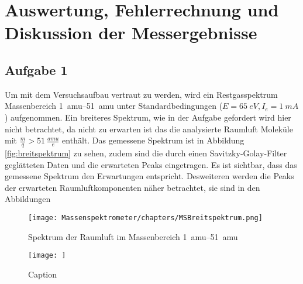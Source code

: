 \chapter{Auswertung, Fehlerrechnung und Diskussion der Messergebnisse}
\section{Aufgabe 1}
Um mit dem Versuchsaufbau vertraut zu werden, wird ein Restgasspektrum Massenbereich \SIrange{1}{51}{amu} unter Standardbedingungen ($E = \SI{65}{eV},I_e =\SI{1}{mA}$) aufgenommen. Ein breiteres Spektrum, wie in der Aufgabe gefordert wird hier nicht betrachtet, da nicht zu erwarten ist das die analysierte Raumluft Moleküle mit $\frac{m}{q} > \SI{51}{\frac{amu}{e}}$ enthält. Das gemessene Spektrum ist  
in Abbildung \ref{fig:breitspektrum} zu sehen, zudem sind die durch einen Savitzky-Golay-Filter geglätteten Daten und die erwarteten Peaks eingetragen. Es ist sichtbar, dass das gemessene Spektrum den Erwartungen entspricht. Desweiteren werden die Peaks der erwarteten Raumluftkomponenten näher betrachtet, sie sind in den Abbildungen  

\begin{figure}
    \centering
    \texttt{[image: Massenspektrometer/chapters/MSBreitspektrum.png]}
    \caption{Spektrum der Raumluft im Massenbereich \SIrange[]{1}{51}{amu}}
    \label{fig:MSbreitspektrum}
\end{figure}

\begin{figure}
    \centering
    \texttt{[image: ]}
    \caption{Caption}
    \label{fig:enter-label}
\end{figure}
